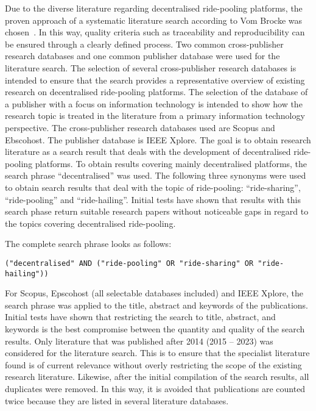 Due to the diverse literature regarding decentralised ride-pooling platforms, the proven approach of a systematic literature search according to Vom Brocke was chosen~\cite{vomBrocke.2009}. In this way, quality criteria such as traceability and reproducibility can be ensured through a clearly defined process. Two common cross-publisher research databases and one common publisher database were used for the literature search.
The selection of several cross-publisher research databases is intended to ensure that the search provides a representative overview of existing research on decentralised ride-pooling platforms. The selection of the database of a publisher with a focus on information technology is intended to show how the research topic is treated in the literature from a primary information technology perspective. The cross-publisher research databases used are Scopus and Ebscohost. The publisher database is IEEE Xplore.
The goal is to obtain research literature as a search result that deals with the development of decentralised ride-pooling platforms. To obtain results covering mainly decentralised platforms, the search phrase ``decentralised'' was used. The following three synonyms were used to obtain search results that deal with the topic of ride-pooling: ``ride-sharing'', ``ride-pooling'' and ``ride-hailing''. Initial tests have shown that results with this search phase return suitable research papers without noticeable gaps in regard to the topics covering decentralised ride-pooling.

The complete search phrase looks as follows:
\begin{verbatim}
("decentralised" AND ("ride-pooling" OR "ride-sharing" OR "ride-hailing"))
\end{verbatim}

For Scopus, Epscohost (all selectable databases included) and IEEE Xplore, the search phrase was applied to the title, abstract and keywords of the publications. Initial tests have shown that restricting the search to title, abstract, and keywords is the best compromise between the quantity and quality of the search results. Only literature that was published after 2014 (2015 – 2023) was considered for the literature search. This is to ensure that the specialist literature found is of current relevance without overly restricting the scope of the existing research literature. Likewise, after the initial compilation of the search results, all duplicates were removed. In this way, it is avoided that publications are counted twice because they are listed in several literature databases.

